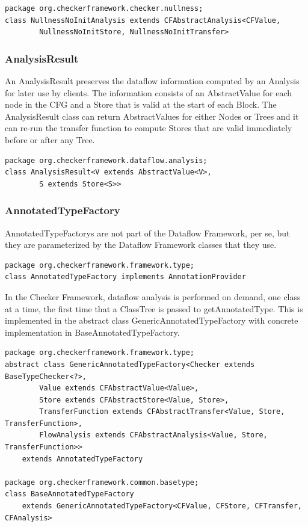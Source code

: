 \begin{verbatim}
package org.checkerframework.checker.nullness;
class NullnessNoInitAnalysis extends CFAbstractAnalysis<CFValue,
        NullnessNoInitStore, NullnessNoInitTransfer>
\end{verbatim}


\subsubsection{AnalysisResult}
\label{sec:analysis_result_class}

An AnalysisResult preserves the dataflow information computed by an
Analysis for later use by clients.  The information consists of an
AbstractValue for each node in the CFG and a Store that is valid at
the start of each Block.  The AnalysisResult class can return
AbstractValues for either Nodes or Trees and it can re-run the
transfer function to compute Stores that are valid immediately before
or after any Tree.

\begin{verbatim}
package org.checkerframework.dataflow.analysis;
class AnalysisResult<V extends AbstractValue<V>,
        S extends Store<S>>
\end{verbatim}


\subsubsection{AnnotatedTypeFactory}
\label{sec:annotated_type_factory_classes}

AnnotatedTypeFactorys are not part of the Dataflow Framework, per se,
but they are parameterized by the Dataflow Framework classes that they
use.

\begin{verbatim}
package org.checkerframework.framework.type;
class AnnotatedTypeFactory implements AnnotationProvider
\end{verbatim}

In the Checker Framework, dataflow analysis is performed on demand,
one class at a time, the first time that a ClassTree is passed to
getAnnotatedType.  This is implemented in the abstract class
GenericAnnotatedTypeFactory with concrete implementation in
BaseAnnotatedTypeFactory.

\begin{verbatim}
package org.checkerframework.framework.type;
abstract class GenericAnnotatedTypeFactory<Checker extends BaseTypeChecker<?>,
        Value extends CFAbstractValue<Value>,
        Store extends CFAbstractStore<Value, Store>,
        TransferFunction extends CFAbstractTransfer<Value, Store, TransferFunction>,
        FlowAnalysis extends CFAbstractAnalysis<Value, Store, TransferFunction>>
    extends AnnotatedTypeFactory

package org.checkerframework.common.basetype;
class BaseAnnotatedTypeFactory
    extends GenericAnnotatedTypeFactory<CFValue, CFStore, CFTransfer, CFAnalysis>
\end{verbatim}


